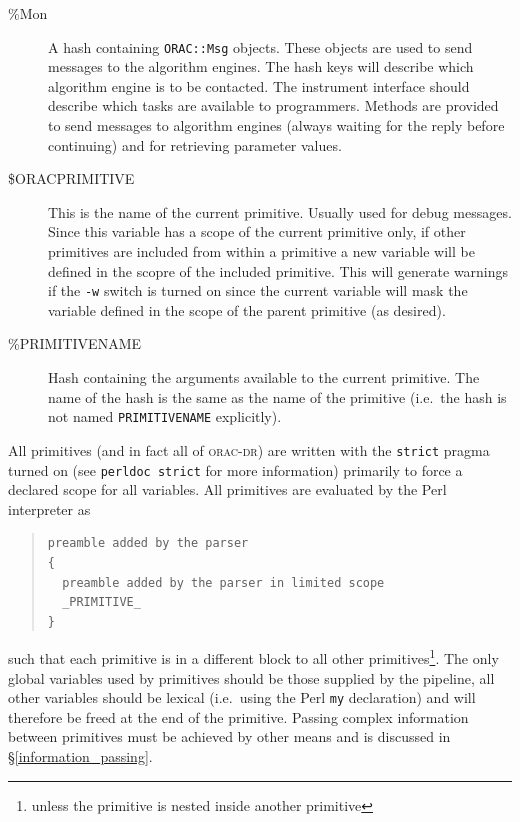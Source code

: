 \documentclass[twoside,11pt]{article}
\renewcommand{\_}{\texttt{\symbol{95}}}
\newcommand{\Oracdr}{\textsc{orac-dr}}
\newenvironment{myquote}{\begin{quote}\begin{small}}{\end{small}\end{quote}}
\begin{document}
\begin{description}
\item[\%Mon] \mbox{}

A hash containing \texttt{ORAC::Msg} objects. These objects are used
to send messages to the algorithm engines. The hash keys will describe 
which algorithm engine is to be contacted. The instrument interface
should describe which tasks are available to programmers. Methods are
provided to send messages to algorithm engines (always waiting for the
reply before continuing) and for retrieving parameter values.

\item[\$ORAC\_PRIMITIVE] \mbox{} %

This is the name of the current primitive. Usually used for debug
messages. Since this variable has a scope of the current primitive
only, if other primitives are included from within a primitive 
a new variable will be defined in the scopre of the included
primitive. This will generate warnings if the \texttt{-w} switch
is turned on since the current variable will mask the variable defined
in the scope of the parent primitive (as desired).


\item[\%\_PRIMITIVE\_NAME\_] \mbox{}

Hash containing the arguments available to the current primitive. The
name of the hash is the same as the name of the primitive (i.e.\ the
hash is not named \texttt{\_PRIMITIVE\_NAME\_} explicitly).

\end{description}

All primitives (and in fact all of \Oracdr) are written with the 
\texttt{strict} pragma turned on (see \texttt{perldoc strict} for more 
information) primarily to force a declared scope for all variables.
All primitives are evaluated by the Perl interpreter as
\begin{myquote}
\begin{verbatim}
preamble added by the parser
{
  preamble added by the parser in limited scope
  _PRIMITIVE_
}
\end{verbatim}
\end{myquote}
such that each primitive is in a different block to all other
primitives\footnote{unless the primitive is nested inside another
primitive}. The only global variables used by primitives should be
those supplied by the pipeline, all other variables should be lexical
(i.e.\ using the Perl \texttt{my} declaration) and will therefore be
freed at the end of the primitive. Passing complex information between 
primitives must be achieved by other means and is discussed in
\S\ref{information_passing}. 
\end{document}
